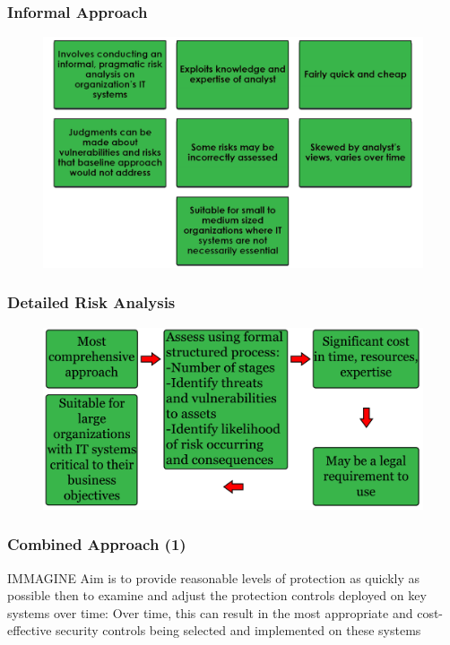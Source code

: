 \documentclass[xcolor ={table,usenames,dvipsnames}]{beamer}
\theoremstyle{definition}
\begin{document}
	\begin{frame}
		\frametitle{Informal Approach}
		\begin{figure}[h!]
			\centering
			\includegraphics[scale=0.27]{img/img_07.PNG}
			\label{Interfacce di un CS}
		\end{figure}
	\end{frame}

	\begin{frame}
		\frametitle{Detailed Risk Analysis}
		\begin{figure}[h!]
			\centering
			\includegraphics[scale=0.23]{img/img_08.PNG}
			\label{Interfacce di un CS}
		\end{figure}
	\end{frame}

	\begin{frame}
		\frametitle{Combined Approach (1)}
		IMMAGINE 
		 Aim is to provide reasonable levels of protection as quickly as possible then to examine and adjust the protection controls deployed on key systems over time:
		Over time, this can result in the most appropriate and cost-effective security controls being selected and implemented on these systems
	\end{frame}
	
\end{document}
